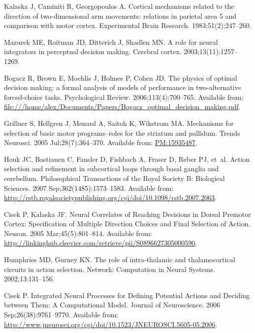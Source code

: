 \documentclass[10pt,letterpaper]{article}
\begin{document}
\begin{thebibliography}{10}
Kalaska J, Caminiti R, Georgopoulos A.
\newblock Cortical mechanisms related to the direction of two-dimensional arm
  movements: relations in parietal area 5 and comparison with motor cortex.
\newblock Experimental Brain Research. 1983;51(2):247--260.

Mazurek ME, Roitman JD, Ditterich J, Shadlen MN.
\newblock A role for neural integrators in perceptual decision making.
\newblock Cerebral cortex. 2003;13(11):1257--1269.

Bogacz R, Brown E, Moehlis J, Holmes P, Cohen JD.
\newblock The physics of optimal decision making: a formal analysis of models
  of performance in two-alternative forced-choice tasks.
\newblock Psychological Review. 2006;113(4):700--765.
\newblock Available from:
  \url{file:///home/alex/Documents/Papers/Bogacz_optimal_decision_making.pdf}.

Grillner S, Hellgren J, Menard A, Saitoh K, Wikstrom MA.
\newblock Mechanisms for selection of basic motor programs–roles for the
  striatum and pallidum.
\newblock Trends Neurosci. 2005 Jul;28(7):364--370.
\newblock Available from: \url{PM:15935487}.

Houk JC, Bastianen C, Fansler D, Fishbach A, Fraser D, Reber PJ, et~al.
\newblock Action selection and refinement in subcortical loops through basal
  ganglia and cerebellum.
\newblock Philosophical Transactions of the Royal Society B: Biological
  Sciences. 2007 Sep;362(1485):1573--1583.
\newblock Available from:
  \url{http://rstb.royalsocietypublishing.org/cgi/doi/10.1098/rstb.2007.2063}.

Cisek P, Kalaska JF.
\newblock Neural {Correlates} of {Reaching} {Decisions} in {Dorsal} {Premotor}
  {Cortex}: {Specification} of {Multiple} {Direction} {Choices} and {Final}
  {Selection} of {Action}.
\newblock Neuron. 2005 Mar;45(5):801--814.
\newblock Available from:
  \url{http://linkinghub.elsevier.com/retrieve/pii/S0896627305000590}.

Humphries MD, Gurney KN.
\newblock The role of intra-thalamic and thalamocortical circuits in action
  selection.
\newblock Network: Computation in Neural Systems. 2002;13:131--156.

Cisek P.
\newblock Integrated {Neural} {Processes} for {Defining} {Potential} {Actions}
  and {Deciding} between {Them}: {A} {Computational} {Model}.
\newblock Journal of Neuroscience. 2006 Sep;26(38):9761--9770.
\newblock Available from:
  \url{http://www.jneurosci.org/cgi/doi/10.1523/JNEUROSCI.5605-05.2006}.


\end{thebibliography}
\end{document}

